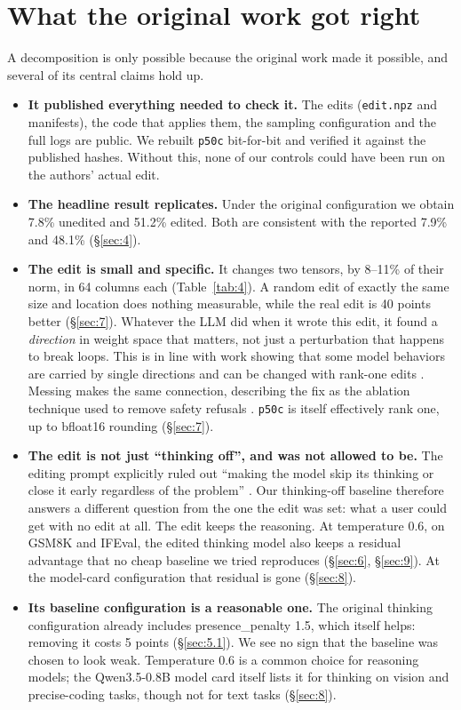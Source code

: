\documentclass[11pt]{article}
\begin{document}
\section{What the original work got right}\label{sec:11}

A decomposition is only possible because the original work made it possible, and several of its central claims hold up.

\begin{itemize}[nosep,leftmargin=*]
\item \textbf{It published everything needed to check it.} The edits (\texttt{edit.npz} and manifests), the code that applies them, the sampling configuration and the full logs are public. We rebuilt \texttt{p50c} bit-for-bit and verified it against the published hashes. Without this, none of our controls could have been run on the authors' actual edit.
\item \textbf{The headline result replicates.} Under the original configuration we obtain 7.8\% unedited and 51.2\% edited. Both are consistent with the reported 7.9\% and 48.1\% (\S\ref{sec:4}).
\item \textbf{The edit is small and specific.} It changes two tensors, by 8--11\% of their norm, in 64 columns each (Table~\ref{tab:4}). A random edit of exactly the same size and location does nothing measurable, while the real edit is 40 points better (\S\ref{sec:7}). Whatever the LLM did when it wrote this edit, it found a \emph{direction} in weight space that matters, not just a perturbation that happens to break loops. This is in line with work showing that some model behaviors are carried by single directions and can be changed with rank-one edits \citep{arditi2024}. Messing makes the same connection, describing the fix as the ablation technique used to remove safety refusals \citep{messing2026}. \texttt{p50c} is itself effectively rank one, up to bfloat16 rounding (\S\ref{sec:7}).
\item \textbf{The edit is not just ``thinking off'', and was not allowed to be.} The editing prompt explicitly ruled out ``making the model skip its thinking or close it early regardless of the problem'' \citep[prompt shown in his thread]{messing2026}. Our thinking-off baseline therefore answers a different question from the one the edit was set: what a user could get with no edit at all. The edit keeps the reasoning. At temperature 0.6, on GSM8K and IFEval, the edited thinking model also keeps a residual advantage that no cheap baseline we tried reproduces (\S\ref{sec:6}, \S\ref{sec:9}). At the model-card configuration that residual is gone (\S\ref{sec:8}).
\item \textbf{Its baseline configuration is a reasonable one.} The original thinking configuration already includes presence\_\allowbreak{}penalty 1.5, which itself helps: removing it costs 5 points (\S\ref{sec:5.1}). We see no sign that the baseline was chosen to look weak. Temperature 0.6 is a common choice for reasoning models; the Qwen3.5-0.8B model card itself lists it for thinking on vision and precise-coding tasks, though not for text tasks (\S\ref{sec:8}).
\end{itemize}
\end{document}
